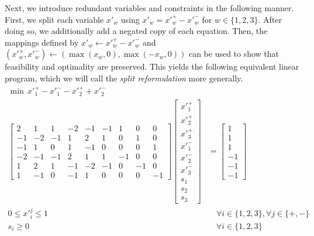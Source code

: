 \documentclass[pdflatex,sn-mathphys-num]{sn-jnl}%
\theoremstyle{thmstyleone}%
\theoremstyle{thmstylethree}%
\theoremstyle{thmstyletwo}%
\begin{document}
Next, we introduce redundant variables and constraints in the following manner. First, we split each variable $x'_w$ using $x'_w = x'^+_w - x'^-_w$ for $w\in \{1,2,3\}$. After doing so, we additionally add a negated copy of each equation. Then, the mappings defined by $x'_w \gets x'^+_w - x'^-_w$ and $(x'^+_w,x'^-_w) \gets (\max(x_w,0), \max(-x_w,0))$ can be used to show that feasibility and optimality are preserved. This yields the following equivalent linear program, which we will call the \emph{split reformulation} more generally.
\begin{subequations}
\label{eq_example_3}
\begin{align}
    \min\,  x'^+_1 - x'^-_1 - x'^+_2  + x'^-_2 & \\
    \begin{bmatrix}
        2 & 1 & 1 & -2 & -1 & -1 & 1 & 0 & 0 \\
        -1 & -2 & -1 & 1 & 2 & 1 & 0 & 1 & 0\\
        -1 & 1 & 0 & 1 & -1 & 0 & 0 & 0 & 1 \\
        -2 & -1 & -1 & 2 & 1 & 1 & -1 & 0 & 0 \\
        1 & 2 & 1 & -1 & -2 & -1 & 0 & -1 & 0\\
        1 & -1 & 0 & -1 & 1 & 0 & 0 & 0 & -1 
    \end{bmatrix}
    \begin{bmatrix}
        x'^+_1\\
        x'^+_2\\
        x'^+_3 \\
        x'^-_1\\
        x'^-_2\\
        x'^-_3 \\
        s_1\\
        s_2\\
        s_3
    \end{bmatrix}
    & = \begin{bmatrix}
    1\\
    1\\
    1\\
    -1\\
    -1\\
    -1
\end{bmatrix}\\
0 \leq x'^j_i \leq 1& \quad\forall i\in \{1,2,3\}, \forall j\in \{+,-\}\\
s_i \geq 0 & \quad\forall i \in \{1,2,3\}
\end{align}    
\end{subequations}
\end{document}

